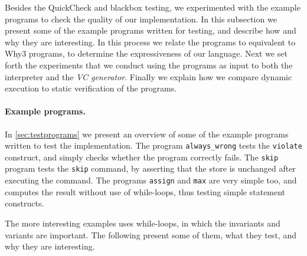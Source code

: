 Besides the QuickCheck and blackbox testing, we experimented with the example programs to check the quality of our implementation.
In this subsection we present some of the example programs written for testing, and describe how and why they are interesting. In this process we relate the programs to equivalent to Why3 programs, to determine the expressiveness of our language.
Next we set forth the experiments that we conduct using the programs as input to both the interpreter and the \textit{VC generator}.
Finally we explain how we compare dynamic execution to static verification of the programs.

\paragraph{Example programs.}
In \cref{sec:testprograms} we present an overview of some of the example programs written to test the implementation.
The program \texttt{always\_wrong} tests the \texttt{violate} construct, and simply checks whether the program correctly fails.
The \texttt{skip} program tests the \texttt{skip} command, by asserting that the store is unchanged after executing the command.
The programs \texttt{assign} and \texttt{max} are very simple too, and computes the result without use of while-loops, thus testing simple statement constructs.

The more interesting examples uses while-loops, in which the invariants and variants are important. The following present some of them, what they test, and why they are interesting.

